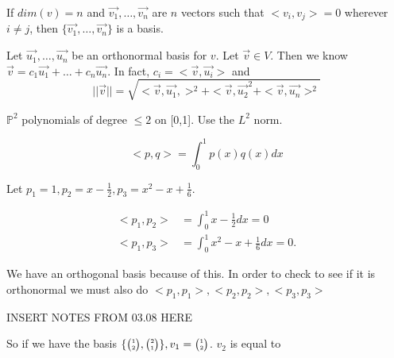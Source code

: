  \begin{corollary}
    If $dim(v)=n$ and $\vec{v_1},\ldots,\vec{v_n}$ are $n$ vectors such that $<v_i,v_j> = 0$ wherever $i\neq j$, then $\{\vec{v_1},\ldots,\vec{v_n}\}$ is a basis.
  \end{corollary}

  \begin{theorem}
    Let $\vec{u_1},\ldots,\vec{u_n}$ be an orthonormal basis for $v$. Let $\vec{v}\in V$. Then we know $\vec{v}=c_1\vec{u_1}+\ldots+c_n \vec{u_n}$. In fact, $c_i=<\vec{v},\vec{u_i}>$ and 
    \begin{equation}
      | |\vec{v} | | = \sqrt{<\vec{v},\vec{u_1},>^2+<\vec{v},\vec{u_2}^2 + <\vec{v},\vec{u_n}>^2}
    \end{equation}
  \end{theorem}

  \begin{problem}
    $\mathbb{P}^2$ polynomials of degree $\le 2$ on [0,1]. Use the $L^2$ norm.

    \begin{equation}
      <p,q> = \int_0^{1}p(x)q(x)dx
    \end{equation}

    Let $p_1=1,p_2=x-\frac{1}{2},p_3=x^2-x+\frac{1}{6}$.

    \begin{align}
      <p_1,p_2> &= \int_0^{1}x-\frac{1}{2}dx=0\\
      <p_1,p_3>&=\int_0^{1}x^2-x+\frac{1}{6}dx=0.
    \end{align}

    We have an orthogonal basis because of this. In order to check to see if it is orthonormal we must also do $<p_1,p_1>,<p_2,p_2>,<p_3,p_3>$
  \end{problem}
  INSERT NOTES FROM 03.08 HERE

  So if we have the basis $\{\SmallMatrix{1\\2},\SmallMatrix{2\\1}\}, v_1=\SmallMatrix{1\\2}$. $v_2$ is equal to 

